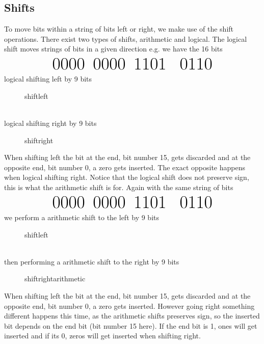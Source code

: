     \subsection{Shifts}
        To move bits within a string of bits left or right, we make use of the shift operations. There exist two types of shifts, arithmetic and logical.
        The logical shift moves strings of bits in a given direction e.g. we have the 16 bits
        \begin{equation*}
            \text{\Huge 0000\, 0000\, 1101 \, 0110}
        \end{equation*}
        logical shifting left by 9 bits
        \begin{figure*}[h!]
            \centering
            {shiftleft}
        \end{figure*}
    \\
        logical shifting right by 9 bits
        \begin{figure*}[h!]
            \centering
            {shiftright}
        \end{figure*} 

        When shifting left the bit at the end, bit number 15, gets discarded and at the opposite end, bit number 0, a zero gets inserted. The exact opposite happens when logical shifting right. Notice that the logical shift does not preserve sign, this is what the arithmetic shift is for. Again with the same string of bits
        \begin{equation*}
            \text{\Huge 0000\, 0000\, 1101 \, 0110}
        \end{equation*}
        we perform a arithmetic shift to the left by 9 bits
        \begin{figure*}[h!]
            \centering
            {shiftleft}
        \end{figure*}
    \\
        then performing a arithmetic shift to the right by 9 bits
        \begin{figure*}[h!]
            \centering
            {shiftrightarithmetic}
        \end{figure*}
        
        When shifting left the bit at the end, bit number 15, gets discarded and at the opposite end, bit number 0, a zero gets inserted. However going right something different happens this time, as the arithmetic shifts preserves sign, so the inserted bit depends on the end bit (bit number 15 here). If the end bit is 1, ones will get inserted and if its 0, zeros will get inserted when shifting right.
        
